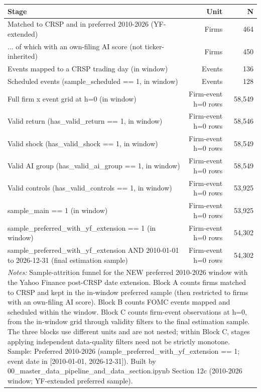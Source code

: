 \begin{tabular}{lrr}
\toprule
Stage & Unit & N \\
\midrule
Matched to CRSP and in preferred 2010-2026 (YF-extended) & Firms & 464 \\
... of which with an own-filing AI score (not ticker-inherited) & Firms & 450 \\
Events mapped to a CRSP trading day (in window) & Events & 136 \\
Scheduled events (sample\_scheduled == 1, in window) & Events & 128 \\
Full firm x event grid at h=0 (in window) & Firm-event h=0 rows & 58,549 \\
Valid return (has\_valid\_return == 1, in window) & Firm-event h=0 rows & 58,546 \\
Valid shock (has\_valid\_shock == 1, in window) & Firm-event h=0 rows & 58,549 \\
Valid AI group (has\_valid\_ai\_group == 1, in window) & Firm-event h=0 rows & 58,549 \\
Valid controls (has\_valid\_controls == 1, in window) & Firm-event h=0 rows & 53,925 \\
sample\_main == 1 (in window) & Firm-event h=0 rows & 53,925 \\
sample\_preferred\_with\_yf\_extension == 1 (in window) & Firm-event h=0 rows & 54,302 \\
sample\_preferred\_with\_yf\_extension AND 2010-01-01 to 2026-12-31 (final estimation sample) & Firm-event h=0 rows & 54,302 \\
\bottomrule
\multicolumn{3}{p{0.95\linewidth}}{\footnotesize \textit{Notes:} Sample-attrition funnel for the NEW preferred 2010-2026 window with the Yahoo Finance post-CRSP date extension. Block A counts firms matched to CRSP and kept in the in-window preferred sample (then restricted to firms with an own-filing AI score). Block B counts FOMC events mapped and scheduled within the window. Block C counts firm-event observations at h=0, from the in-window grid through validity filters to the final estimation sample. The three blocks use different units and are not nested; within Block C, stages applying independent data-quality filters need not be strictly monotone. Sample: Preferred 2010-2026 (sample\_preferred\_with\_yf\_extension == 1; event date in [2010-01-01, 2026-12-31]). Built by 00\_master\_data\_pipeline\_and\_data\_section.ipynb Section 12c (2010-2026 window; YF-extended preferred sample).} \\
\end{tabular}
